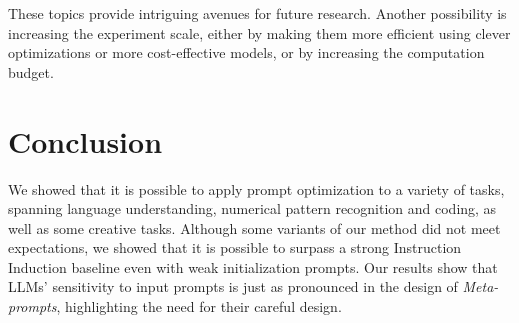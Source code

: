 These topics provide intriguing avenues for future research. Another possibility is increasing the experiment scale, either by making them more efficient
using clever optimizations or more cost-effective models, or by increasing the computation budget. 

\section{Conclusion}
We showed that it is possible to apply prompt optimization to a variety of tasks, spanning language understanding, numerical pattern recognition and coding, as well as some creative tasks.
Although some variants of our method did not meet expectations, we showed that it is possible to surpass a strong Instruction Induction baseline even with weak initialization prompts. 
Our results show that LLMs' sensitivity to input prompts is just as pronounced in the design of \textit{Meta-prompts}, highlighting the need for their careful design.
